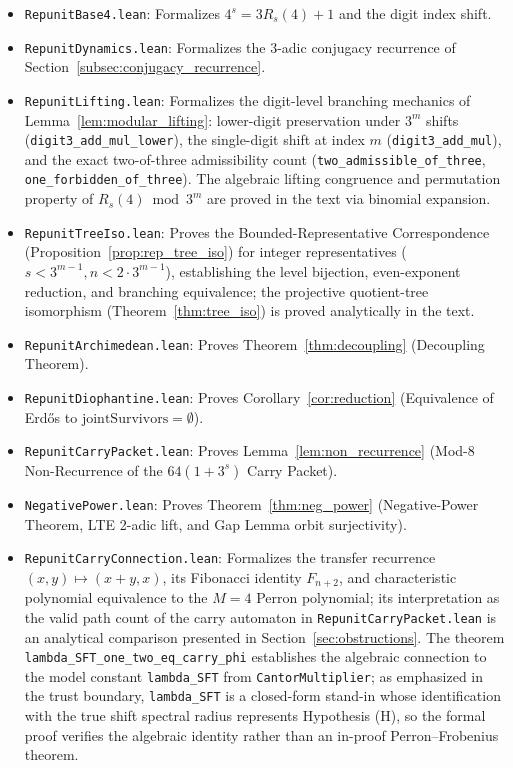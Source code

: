 \documentclass[11pt,reqno]{amsart}
\theoremstyle{plain}
\theoremstyle{definition}
\theoremstyle{remark}
\begin{document}
{\sloppy
\begin{itemize}\setlength{\itemsep}{0.5pt}\setlength{\parsep}{0pt}\setlength{\parskip}{0pt}
    \item \texttt{RepunitBase4.lean}: Formalizes $4^s = 3 R_s(4) + 1$ and the digit index shift.
    \item \texttt{RepunitDynamics.lean}: Formalizes the $3$-adic conjugacy recurrence of Section~\ref{subsec:conjugacy_recurrence}.
    \item \texttt{RepunitLifting.lean}: Formalizes the digit-level branching mechanics of Lemma~\ref{lem:modular_lifting}: lower-digit preservation under $3^m$ shifts (\texttt{digit3\_add\_mul\_lower}), the single-digit shift at index $m$ (\texttt{digit3\_add\_mul}), and the exact two-of-three admissibility count (\texttt{two\_admissible\_of\_three}, \texttt{one\_forbidden\_of\_three}). The algebraic lifting congruence and permutation property of $R_s(4) \bmod 3^m$ are proved in the text via binomial expansion.
    \item \texttt{RepunitTreeIso.lean}: Proves the Bounded-Representative Correspondence (Proposition~\ref{prop:rep_tree_iso}) for integer representatives ($s < 3^{m-1}, n < 2 \cdot 3^{m-1}$), establishing the level bijection, even-exponent reduction, and branching equivalence; the projective quotient-tree isomorphism (Theorem~\ref{thm:tree_iso}) is proved analytically in the text.
    \item \texttt{RepunitArchimedean.lean}: Proves Theorem~\ref{thm:decoupling} (Decoupling Theorem).
    \item \texttt{RepunitDiophantine.lean}: Proves Corollary~\ref{cor:reduction} (Equivalence of Erd\H{o}s to $\mathrm{jointSurvivors} = \emptyset$).
    \item \texttt{RepunitCarryPacket.lean}: Proves Lemma~\ref{lem:non_recurrence} (Mod-8 Non-Recurrence of the $64(1+3^s)$ Carry Packet).
    \item \texttt{NegativePower.lean}: Proves Theorem~\ref{thm:neg_power} (Negative-Power Theorem, LTE 2-adic lift, and Gap Lemma orbit surjectivity).
    \item \texttt{RepunitCarryConnection.lean}: Formalizes the transfer recurrence $(x,y) \mapsto (x+y,x)$, its Fibonacci identity $F_{n+2}$, and characteristic polynomial equivalence to the $M=4$ Perron polynomial; its interpretation as the valid path count of the carry automaton in \texttt{RepunitCarryPacket.lean} is an analytical comparison presented in Section~\ref{sec:obstructions}. The theorem \texttt{lambda\_SFT\_one\_two\_eq\_carry\_phi} establishes the algebraic connection to the model constant \texttt{lambda\_SFT} from \texttt{CantorMultiplier}; as emphasized in the trust boundary, \texttt{lambda\_SFT} is a closed-form stand-in whose identification with the true shift spectral radius represents Hypothesis (H), so the formal proof verifies the algebraic identity rather than an in-proof Perron--Frobenius theorem.

\end{itemize}}
\end{document}
